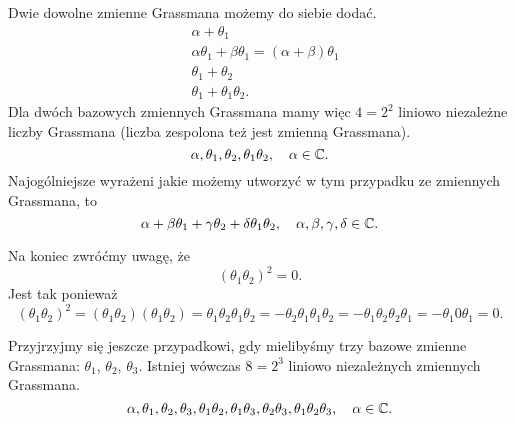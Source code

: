 \documentclass[a4paper,11pt]{article}
\begin{document}
Dwie dowolne zmienne Grassmana możemy do siebie dodać.
\begin{subequations}
  \begin{align}
    \label{eq:Zmienne-Grassmana-07-A}
    &\alpha + \theta_{ 1 } \\
    \label{eq:Zmienne-Grassmana-07-B}
    &\alpha \theta_{ 1 } + \beta \theta_{ 1 } = ( \alpha + \beta ) \theta_{ 1 } \\
    \label{eq:Zmienne-Grassmana-07-C}
    &\theta_{ 1 } + \theta_{ 2 } \\
        \label{eq:Zmienne-Grassmana-07-D}
    &\theta_{ 1 } + \theta_{ 1 } \theta_{ 2 }.
  \end{align}
\end{subequations}
Dla dwóch bazowych zmiennych Grassmana mamy więc $4 = 2^2$ liniowo niezależne liczby Grassmana (liczba zespolona też jest zmienną Grassmana).
\begin{equation}
  \label{eq:Zmienne-Grassmana-08}
  \alpha, \theta_{ 1 }, \theta_{ 2 }, \theta_{ 1 } \theta_{ 2 }, \quad \alpha \in \mathbb{C}.
\end{equation}
Najogólniejsze wyrażeni jakie możemy utworzyć w tym przypadku ze zmiennych Grassmana, to
\begin{equation}
  \label{eq:Zmienne-Grassmana-09}
  \alpha + \beta \theta_{ 1 } + \gamma \theta_{ 2 } + \delta \theta_{ 1 } \theta_{ 2 }, \quad
  \alpha, \beta, \gamma, \delta \in \mathbb{C}.
\end{equation}

Na koniec zwróćmy uwagę, że
\begin{equation}
  \label{eq:Zmienne-Grassmana-10}
  ( \theta_{ 1 } \theta_{ 2 } )^{ 2 } = 0.
\end{equation}
Jest tak ponieważ
\begin{equation}
  \label{eq:Zmienne-Grassmana-10}
  ( \theta_{ 1 } \theta_{ 2 } )^{ 2 } =
  ( \theta_{ 1 } \theta_{ 2 } ) ( \theta_{ 1 } \theta_{ 2 } ) =
  \theta_{ 1 } \theta_{ 2 } \theta_{ 1 } \theta_{ 2 } =
  -\theta_{ 2 } \theta_{ 1 } \theta_{ 1 } \theta_{ 2 } =
  -\theta_{ 1 } \theta_{ 2 } \theta_{ 2 } \theta_{ 1 } =
  -\theta_{ 1 } 0 \theta_{ 1 } = 0.
\end{equation}

Przyjrzyjmy się jeszcze przypadkowi, gdy mielibyśmy trzy bazowe zmienne Grassmana: $\theta_{ 1 }$, $\theta_{ 2 }$, $\theta_{ 3 }$. Istniej wówczas $8 = 2^{ 3 }$ liniowo niezależnych zmiennych Grassmana.
\begin{equation}
  \label{eq:Zmienne-Grassmana-11}
  \alpha, \theta_{ 1 }, \theta_{ 2 }, \theta_{ 3 }, \theta_{ 1 } \theta_{ 2 }, \theta_{ 1 } \theta_{ 3 },
  \theta_{ 2 } \theta_{ 3 }, \theta_{ 1 } \theta_{ 2 } \theta_{ 3 }, \quad \alpha \in \mathbb{C}.
\end{equation}
\end{document}
